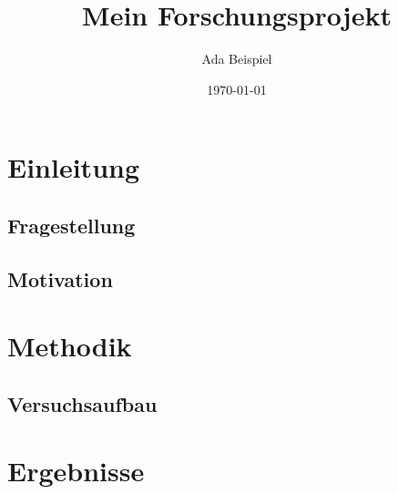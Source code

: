 \documentclass[a4paper,11pt]{article}
\title{Mein Forschungsprojekt}
\author{Ada Beispiel}
\date{\today}
\begin{document}
\maketitle

\section{Einleitung}

\subsection{Fragestellung}

\subsection{Motivation}

\section{Methodik}

\subsection{Versuchsaufbau}

\section{Ergebnisse}
\end{document}
